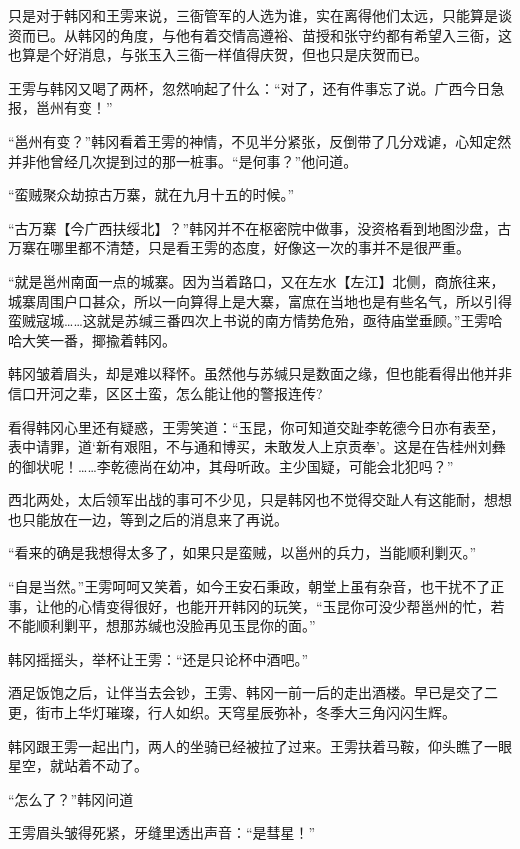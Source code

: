 只是对于韩冈和王雱来说，三衙管军的人选为谁，实在离得他们太远，只能算是谈资而已。从韩冈的角度，与他有着交情高遵裕、苗授和张守约都有希望入三衙，这也算是个好消息，与张玉入三衙一样值得庆贺，但也只是庆贺而已。

王雱与韩冈又喝了两杯，忽然响起了什么：“对了，还有件事忘了说。广西今日急报，邕州有变！”

“邕州有变？”韩冈看着王雱的神情，不见半分紧张，反倒带了几分戏谑，心知定然并非他曾经几次提到过的那一桩事。“是何事？”他问道。

“蛮贼聚众劫掠古万寨，就在九月十五的时候。”

“古万寨【今广西扶绥北】？”韩冈并不在枢密院中做事，没资格看到地图沙盘，古万寨在哪里都不清楚，只是看王雱的态度，好像这一次的事并不是很严重。

“就是邕州南面一点的城寨。因为当着路口，又在左水【左江】北侧，商旅往来，城寨周围户口甚众，所以一向算得上是大寨，富庶在当地也是有些名气，所以引得蛮贼寇城……这就是苏缄三番四次上书说的南方情势危殆，亟待庙堂垂顾。”王雱哈哈大笑一番，揶揄着韩冈。

韩冈皱着眉头，却是难以释怀。虽然他与苏缄只是数面之缘，但也能看得出他并非信口开河之辈，区区土蛮，怎么能让他的警报连传?

看得韩冈心里还有疑惑，王雱笑道：“玉昆，你可知道交趾李乾德今日亦有表至，表中请罪，道‘新有艰阻，不与通和博买，未敢发人上京贡奉’。这是在告桂州刘彝的御状呢！……李乾德尚在幼冲，其母听政。主少国疑，可能会北犯吗？”

西北两处，太后领军出战的事可不少见，只是韩冈也不觉得交趾人有这能耐，想想也只能放在一边，等到之后的消息来了再说。

“看来的确是我想得太多了，如果只是蛮贼，以邕州的兵力，当能顺利剿灭。”

“自是当然。”王雱呵呵又笑着，如今王安石秉政，朝堂上虽有杂音，也干扰不了正事，让他的心情变得很好，也能开开韩冈的玩笑，“玉昆你可没少帮邕州的忙，若不能顺利剿平，想那苏缄也没脸再见玉昆你的面。”

韩冈摇摇头，举杯让王雱：“还是只论杯中酒吧。”

酒足饭饱之后，让伴当去会钞，王雱、韩冈一前一后的走出酒楼。早已是交了二更，街市上华灯璀璨，行人如织。天穹星辰弥补，冬季大三角闪闪生辉。

韩冈跟王雱一起出门，两人的坐骑已经被拉了过来。王雱扶着马鞍，仰头瞧了一眼星空，就站着不动了。

“怎么了？”韩冈问道

王雱眉头皱得死紧，牙缝里透出声音：“是彗星！”


